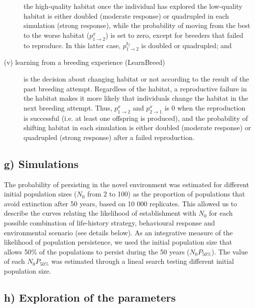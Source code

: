 \begin{description}
    the high-quality habitat once the individual has
    explored the low-quality habitat is either doubled
    (moderate response) or quadrupled in each simulation
    (strong response), while the probability of moving
    from the best to the worse habitat ($p^{x}_{1 \rightarrow 2}$) is set to
    zero, except for breeders that failed to reproduce. In
    this latter case, $p^{b_{f}}_{1 \rightarrow 2}$ is doubled or quadrupled; and
  \item[(v) learning from a breeding experience (LearnBreed)] is the
    decision about changing habitat or not according to
    the result of the past breeding attempt. Regardless of
    the habitat, a reproductive failure in the habitat
    makes it more likely that individuals change the habitat
    in the next breeding attempt. Thus, $p^{x}_{1 \rightarrow 2}$ and $p^{x}_{2 \rightarrow 1}$
    is 0 when the reproduction is successful (i.e. at least
    one offspring is produced), and the probability of
    shifting habitat in each simulation is either doubled
    (moderate response) or quadrupled (strong response)
    after a failed reproduction.
\end{description}


\subsection*{g) Simulations}

The probability of persisting in the novel environment was
estimated for different initial population sizes ($N_{0}$ from 2 to
100) as the proportion of populations that avoid extinction
after 50 years, based on 10 000 replicates. This allowed us to
describe the curves relating the likelihood of establishment
with $N_{0}$ for each possible combination of life-history strategy,
behavioural response and environmental scenario (see details
below). As an integrative measure of the likelihood of population
persistence, we used the initial population size that
allows 50\% of the populations to persist during the 50 years
($N_{0}P_{50\%}$). The value of each $N_{0}P_{50\%}$ was estimated through a
lineal search testing different initial population size.


\subsection*{h) Exploration of the parameters}

